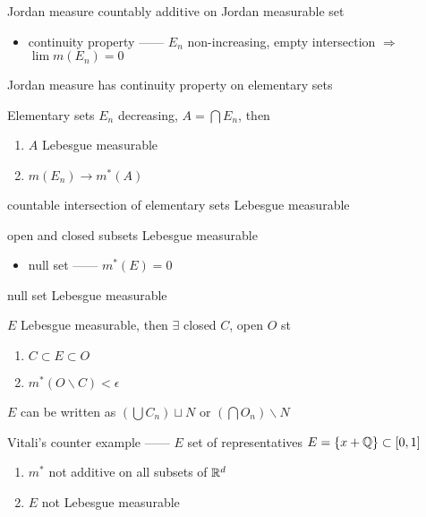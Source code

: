 \begin{fact}
    Jordan measure countably additive on Jordan measurable set
\end{fact}

\begin{itemize}
    \item continuity property ------ $E_n$ non-increasing, empty intersection $\Rightarrow$ $\lim m(E_n) = 0$
\end{itemize}

\begin{lemma}
    Jordan measure has continuity property on elementary sets
\end{lemma}

\begin{lemma}
    Elementary sets  $E_n$ decreasing, $A = \bigcap E_n$, then
    \begin{enumerate}
        \item $A$ Lebesgue measurable
        \item $m(E_n) \rightarrow m^\ast(A)$
    \end{enumerate}
\end{lemma}

\begin{fact}
    countable intersection of elementary sets Lebesgue measurable
\end{fact}

\begin{cor}
    open and closed subsets Lebesgue measurable
\end{cor}

\begin{itemize}
    \item null set ------ $m^\ast(E) = 0$
\end{itemize}

\begin{lemma}
    null set Lebesgue measurable
\end{lemma}

\begin{prop}
    $E$ Lebesgue measurable, then $\exists$ closed $C$, open $O$ st
    \begin{enumerate}
        \item $C \subset E \subset O$
        \item $m^\ast(O\backslash C) < \epsilon$
    \end{enumerate}
\end{prop}

\begin{fact}
    $E$ can be written as $\left( \bigcup C_n \right) \sqcup N$ or $\left( \bigcap O_n \right) \backslash N$
\end{fact}

\begin{example}
    Vitali's counter example ------ $E$ set of representatives $E = \{ x + \mathbb{Q}\} \subset [0,1]$
    \begin{enumerate}
        \item $m^\ast$ not additive on all subsets of $\mathbb{R}^d$
        \item $E$ not Lebesgue measurable
    \end{enumerate}
\end{example}

